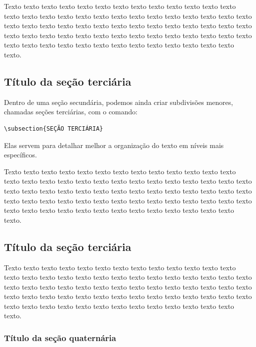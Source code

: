Texto texto texto texto texto texto texto texto texto texto texto texto texto texto texto texto texto texto texto texto texto texto texto texto texto texto texto texto texto texto texto texto texto texto texto texto texto texto texto texto texto texto texto texto texto texto texto texto texto texto texto texto texto texto texto texto texto texto texto texto texto texto texto texto texto texto texto texto texto.

\subsection{Título da seção terciária}

Dentro de uma seção secundária, podemos ainda criar subdivisões menores, chamadas seções terciárias, com o comando:

\begin{verbatim}
\subsection{SEÇÃO TERCIÁRIA}
\end{verbatim}

Elas servem para detalhar melhor a organização do texto em níveis mais específicos.

Texto texto texto texto texto texto texto texto texto texto texto texto texto texto texto texto texto texto texto texto texto texto texto texto texto texto texto texto texto texto texto texto texto texto texto texto texto texto texto texto texto texto texto texto texto texto texto texto texto texto texto texto texto texto texto texto texto texto texto texto texto texto texto texto texto texto texto texto texto.

\subsection{Título da seção terciária}

Texto texto texto texto texto texto texto texto texto texto texto texto texto texto texto texto texto texto texto texto texto texto texto texto texto texto texto texto texto texto texto texto texto texto texto texto texto texto texto texto texto texto texto texto texto texto texto texto texto texto texto texto texto texto texto texto texto texto texto texto texto texto texto texto texto texto texto texto texto.

\subsubsection{Título da seção quaternária}

